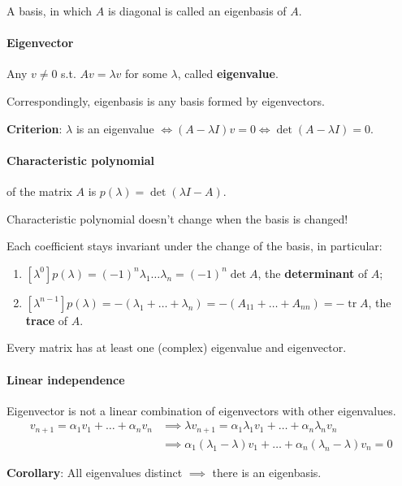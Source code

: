 \documentclass{article}
\begin{document}
A basis, in which $A$ is diagonal is called an eigenbasis of $A$.

\paragraph{Eigenvector} Any $v \neq 0$ s.t. $Av = \lambda v$ for some $\lambda$, called \textbf{eigenvalue}.


Correspondingly, eigenbasis is any basis formed by eigenvectors.

\textbf{Criterion}: $\lambda$ is an eigenvalue $\iff (A-\lambda I)v=0 \iff \det(A-\lambda I) =0$.

\paragraph{Characteristic polynomial} of the matrix $A$ is $p(\lambda)=\det(\lambda I - A)$.

Characteristic polynomial doesn't change when the basis is changed!

Each coefficient stays invariant under the change of the basis, in particular:

\begin{enumerate}
    \item $[\lambda^0] p(\lambda) = (-1)^n\lambda_1 \dots \lambda_n = (-1)^n\det A$, the \textbf{determinant} of $A$;
    \item $[\lambda^{n-1}]p(\lambda) = -(\lambda_1+\dots+\lambda_n) = -(A_{11}+\dots+A_{nn}) = -\operatorname{tr} A$, the \textbf{trace} of $A$.
\end{enumerate}

Every matrix has at least one (complex) eigenvalue and eigenvector.

\paragraph{Linear independence} Eigenvector is not a linear combination of eigenvectors with other eigenvalues.
\begin{align*}
v_{n+1} = \alpha_1v_1+\dots+\alpha_{n} v_{n} &\implies \lambda v_{n+1} = \alpha_1 \lambda_1 v_1 + \dots + \alpha_{n} \lambda_{n} v_{n} \\
&\implies \alpha_1 (\lambda_1 - \lambda) v_1 + \dots + \alpha_{n} (\lambda_n-\lambda)v_n = 0
\end{align*}

\textbf{Corollary}: All eigenvalues distinct $\implies$ there is an eigenbasis.
\end{document}
